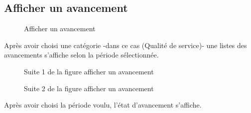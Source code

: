 \documentclass[a4paper]{report}
\begin{document}
\begin{doublespace}
	\subsection{Afficher un avancement}
	\begin{figure}[H]
		\begin{center}
			\caption{Afficher un avancement}
		\end{center}
	\end{figure}
	Après avoir choisi une catégorie -dans ce cas (Qualité de service)- une listes des avancements s'affiche selon la période sélectionnée.
	\begin{figure}[H]
		\begin{center}
			\caption{Suite 1 de la figure afficher un avancement}
		\end{center}
	\end{figure}
	\begin{figure}[H]
		\begin{center}
			\caption{Suite 2 de la figure afficher un avancement}
		\end{center}
	\end{figure}
	Après avoir choisi la période voulu, l'état d'avancement s'affiche.

\end{doublespace}
\end{document}

